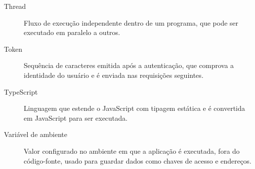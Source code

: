 \begin{description}
  \item[Thread] Fluxo de execução independente dentro de um programa, que pode ser executado em paralelo a outros.
  \item[Token] Sequência de caracteres emitida após a autenticação, que comprova a identidade do usuário e é enviada nas requisições seguintes.
  \item[TypeScript] Linguagem que estende o JavaScript com tipagem estática e é convertida em JavaScript para ser executada.
  \item[Variável de ambiente] Valor configurado no ambiente em que a aplicação é executada, fora do código-fonte, usado para guardar dados como chaves de acesso e endereços.
\end{description}
